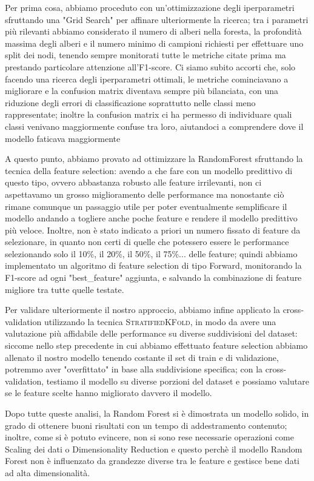 \documentclass{article}
\begin{document}
\begin{multicols}{2}
Per prima cosa, abbiamo proceduto con un’ottimizzazione degli iperparametri sfruttando una "Grid Search" per affinare ulteriormente la ricerca; tra i parametri più rilevanti abbiamo considerato il numero di alberi nella foresta, la profondità massima degli alberi e il numero minimo di campioni richiesti per effettuare uno split dei nodi, tenendo sempre monitorati tutte le metriche citate prima ma prestando particolare attenzione all'F1-score. Ci siamo subito accorti che, solo facendo una ricerca degli iperparametri ottimali, le metriche cominciavano a migliorare e la confusion matrix diventava sempre più bilanciata, con una riduzione degli errori di classificazione soprattutto nelle classi meno rappresentate; inoltre la confusion matrix ci ha permesso di individuare quali classi venivano maggiormente confuse tra loro, aiutandoci a comprendere dove il modello faticava maggiormente

A questo punto, abbiamo provato ad ottimizzare la RandomForest sfruttando la tecnica della feature selection: avendo a che fare con un modello predittivo di questo tipo, ovvero abbastanza robusto alle feature irrilevanti, non ci aspettavamo un grosso miglioramento delle performance ma nonostante ciò rimane comunque un passaggio utile per poter eventualmente semplificare il modello andando a togliere anche poche feature e rendere il modello predittivo più veloce. Inoltre, non è stato indicato a priori un numero fissato di feature da selezionare, in quanto non certi di quelle che potessero essere le performance selezionando solo il 10\%, il 20\%, il 50\%, il 75\%... delle feature; quindi abbiamo implementato un algoritmo di feature selection di tipo Forward, monitorando la F1-score ad ogni "best\_feature" aggiunta, e salvando la combinazione di feature migliore tra tutte quelle testate.

Per validare ulteriormente il nostro approccio, abbiamo infine applicato la cross-validation utilizzando la tecnica \textsc{StratifiedKFold}, in modo da avere una valutazione più affidabile delle performance su diverse suddivisioni del dataset: siccome nello step precedente in cui abbiamo effettuato feature selection abbiamo allenato il nostro modello tenendo costante il set di train e di validazione, potremmo aver "overfittato" in base alla suddivisione specifica; con la cross-validation, testiamo il modello su diverse porzioni del dataset e possiamo valutare se le feature scelte hanno migliorato davvero il modello.

Dopo tutte queste analisi, la Random Forest si è dimostrata un modello solido, in grado di ottenere buoni risultati con un tempo di addestramento contenuto; inoltre, come si è potuto evincere, non si sono rese necessarie operazioni come Scaling dei dati o Dimensionality Reduction e questo perchè il modello Random Forest non è influenzato da grandezze diverse tra le feature e gestisce bene dati ad alta dimensionalità.


\end{multicols}
\end{document}
